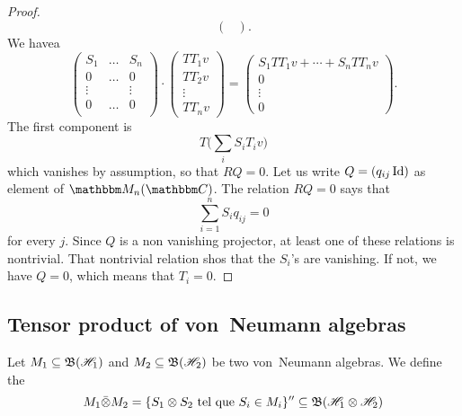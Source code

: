\begin{proof}
\[\begin{pmatrix}
\end{pmatrix}.
\]
We havea
\[ 
\begin{pmatrix}
S_1&\ldots & S_n\\
0&\ldots & 0 \\
\vdots  &&\vdots\\
0&\ldots & 0 \\
\end{pmatrix}\cdot
  \begin{pmatrix}
TT_1 v\\
TT_2 v\\
\vdots\\
TT_nv
\end{pmatrix}
=
\begin{pmatrix}
S_1TT_1v+\cdots+S_nTT_nv\\
0\\
\vdots\\
0
\end{pmatrix}.
\]
The first component is
\[ 
  T\big( \sum_i S_iT_iv \big)
\]
which vanishes by assumption, so that $RQ=0$. Let us write $Q=(q_{ij}\operatorname{Id})$ as element of $\eM_n(\eC)$. The relation $RQ=0$ says that
\begin{equation}
		\sum_{i=1}^n S_iq_{ij}=0
\end{equation}
for every $j$. Since $Q$ is a non vanishing projector, at least one of these relations is nontrivial. That nontrivial relation shos that the $S_i$'s are vanishing. If not, we have $Q=0$, which means that $T_i=0$.
\end{proof}

					\subsection{Tensor product of von~Neumann algebras}

Let $M_1\subseteq\mathfrak{B}(\mathscr{H}_1)$ and $M_2\subseteq\mathfrak{B}(\mathscr{H}_2)$ be two von~Neumann algebras. We define the 
\begin{equation}
	M_1\bar\otimes M_2=\{ S_1\otimes S_2\text{ tel que } S_i\in M_i \}''\subseteq\mathfrak{B}(\mathscr{H}_1\otimes\mathscr{H}_2)
\end{equation}
